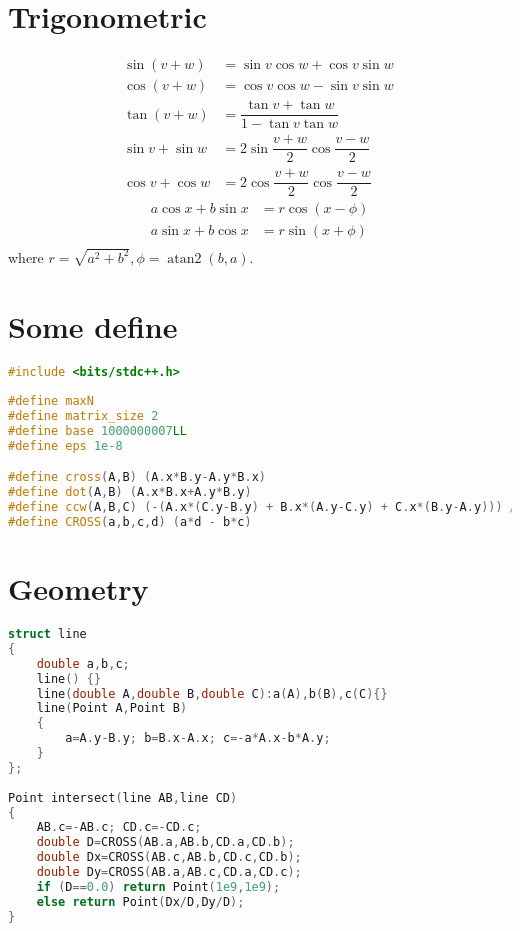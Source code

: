 \documentclass[A4 paper, 12pt]{article}
\begin{document}
    \section{Trigonometric}
    \begin{align*}
        \sin(v+w)&= \sin v\cos w+\cos v\sin w \\
        \cos(v+w)&=\cos v\cos w-\sin v\sin w\ \\
        \tan(v+w)&=\dfrac{\tan v+\tan w}{1-\tan v\tan w} \\
        \sin v+\sin w&=2\sin\dfrac{v+w}{2}\cos\dfrac{v-w}{2} \\
        \cos v+\cos w&=2\cos\dfrac{v+w}{2}\cos\dfrac{v-w}{2} 
    \end{align*}
    \begin{align*}
        a\cos x+b\sin x&=r\cos(x-\phi)\\
        a\sin x+b\cos x&=r\sin(x+\phi)\\
    \end{align*}
    where $r=\sqrt{a^2+b^2}, \phi=\operatorname{atan2}(b,a)$.

	\section{Some define}
	\begin{lstlisting}[language=C++]
#include <bits/stdc++.h>
 
#define maxN
#define matrix_size 2
#define base 1000000007LL
#define eps 1e-8

#define cross(A,B) (A.x*B.y-A.y*B.x)
#define dot(A,B) (A.x*B.x+A.y*B.y)
#define ccw(A,B,C) (-(A.x*(C.y-B.y) + B.x*(A.y-C.y) + C.x*(B.y-A.y))) // positive when ccw
#define CROSS(a,b,c,d) (a*d - b*c)
\end{lstlisting}
	\section{Geometry}
	\begin{lstlisting}[language=C++]
struct line
{
	double a,b,c;
	line() {}
	line(double A,double B,double C):a(A),b(B),c(C){}
	line(Point A,Point B)
	{
    	a=A.y-B.y; b=B.x-A.x; c=-a*A.x-b*A.y;
	}
};
 
Point intersect(line AB,line CD)
{
	AB.c=-AB.c; CD.c=-CD.c;
	double D=CROSS(AB.a,AB.b,CD.a,CD.b);
	double Dx=CROSS(AB.c,AB.b,CD.c,CD.b);
	double Dy=CROSS(AB.a,AB.c,CD.a,CD.c);
	if (D==0.0) return Point(1e9,1e9);
	else return Point(Dx/D,Dy/D);
}
\end{lstlisting}
\end{document}

